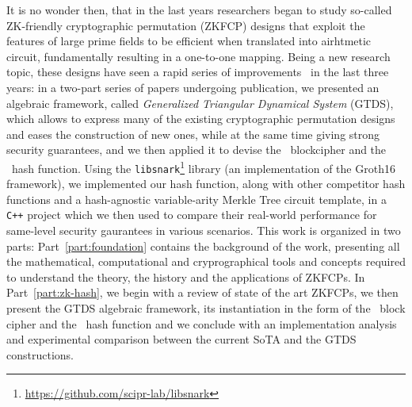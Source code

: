 It is no wonder then, that in the last years researchers began to study so-called ZK-friendly 
cryptographic permutation (ZKFCP) designs that exploit the features of large prime fields to be 
efficient when translated into airhtmetic circuit, fundamentally resulting in a one-to-one mapping.
Being a new research topic, these designs have seen a rapid series of 
improvements~\cite{AlbrechtGRRT2016,GrassiKRRS2021,GrassiHRSWW2022} in the last three years:
in a two-part series of papers undergoing publication, we presented an algebraic 
framework, called \emph{Generalized Triangular Dynamical System} (GTDS), which allows to express
many of the existing cryptographic permutation designs and eases the construction of new ones, while
at the same time giving strong security guarantees, and we then applied it to devise the \Blocc\ 
blockcipher and the \Stamp\ hash function.
Using the \texttt{libsnark}\footnote{\url{https://github.com/scipr-lab/libsnark}} library (an 
implementation of the Groth16 framework), we implemented our hash function, along with other 
competitor hash functions and a hash-agnostic variable-arity Merkle Tree circuit template, in a 
\texttt{C++} project which we then used to compare their real-world performance for same-level 
security gaurantees in various scenarios.
This work is organized in two parts: Part~\ref{part:foundation} contains the background of 
the work, presenting all the mathematical, computational and cryprographical tools and concepts 
required to understand the theory, the history and the applications of ZKFCPs.
In Part~\ref{part:zk-hash}, we begin with a review of state of the art ZKFCPs,
we then present the GTDS algebraic framework, its instantiation in the form of the \Blocc\ block 
cipher and the \Stamp\ hash function and we conclude with an implementation analysis and 
experimental comparison between the current SoTA and the GTDS constructions. 

